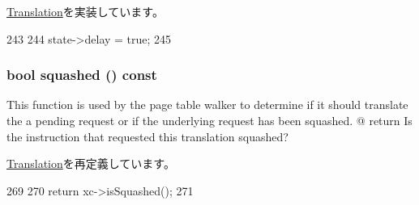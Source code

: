 \hyperlink{classBaseTLB_1_1Translation_ab88d5e1938190b55d7859d5cc4d10446}{Translation}を実装しています。


\begin{DoxyCode}
243     {
244         state->delay = true;
245     }
\end{DoxyCode}
\hypertarget{classDataTranslation_af355b62f22559090d6e3047bdf83f24f}{
\subsubsection[{squashed}]{\setlength{\rightskip}{0pt plus 5cm}bool squashed () const}}
\label{classDataTranslation_af355b62f22559090d6e3047bdf83f24f}
This function is used by the page table walker to determine if it should translate the a pending request or if the underlying request has been squashed. @ return Is the instruction that requested this translation squashed? 

\hyperlink{classBaseTLB_1_1Translation_a1c71e1db7a83ffde808111e2b1cec6c6}{Translation}を再定義しています。


\begin{DoxyCode}
269     {
270         return xc->isSquashed();
271     }
\end{DoxyCode}


